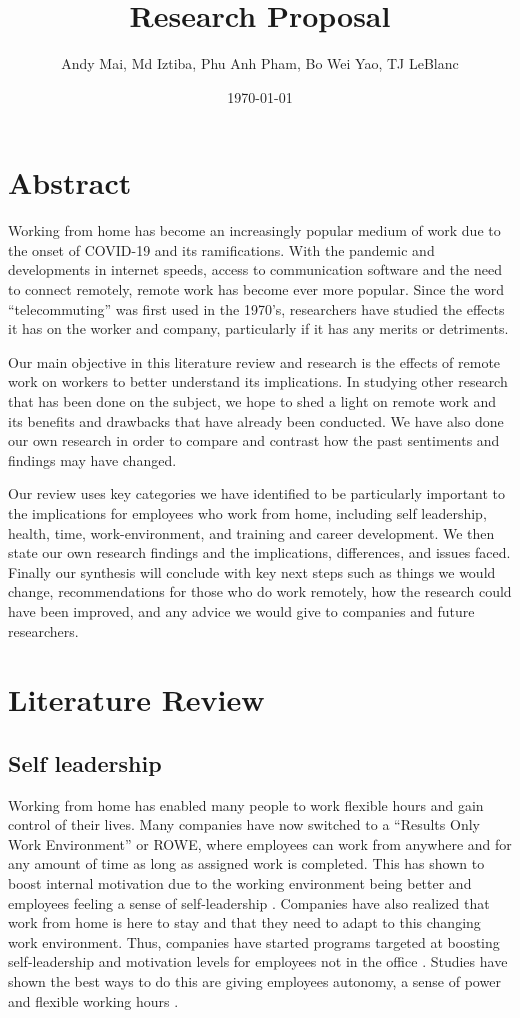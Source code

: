 \documentclass[12pt]{article}
\title{Research Proposal}
\author{Andy Mai, Md Iztiba, Phu Anh Pham, Bo Wei Yao, TJ LeBlanc}
\date{\today}
\begin{document}
\maketitle

\section*{Abstract}
Working from home has become an increasingly popular medium of work due to the onset of COVID-19 and its ramifications. With the pandemic and developments in internet speeds, access to communication software and the need to connect remotely, remote work has become ever more popular. Since the word “telecommuting” was first used in the 1970’s, researchers have studied the effects it has on the worker and company, particularly if it has any merits or detriments. 

Our main objective in this literature review and research is the effects of remote work on workers to better understand its implications. In studying other research that has been done on the subject, we hope to shed a light on remote work and its benefits and drawbacks that have already been conducted. We have also done our own research in order to compare and contrast how the past sentiments and findings may have changed. 

Our review uses key categories we have identified to be particularly important to the implications for employees who work from home, including self leadership, health, time, work-environment, and training and career development. We then state our own research findings and the implications, differences, and issues faced. Finally our synthesis will conclude with key next steps such as things we would change, recommendations for those who do work remotely, how the research could have been improved, and any advice we would give to companies and future researchers. 

\section*{Literature Review}

\subsection*{Self leadership}
Working from home has enabled many people to work flexible hours and gain control of their lives. Many companies have now switched to a “Results Only Work Environment” or ROWE, where employees can work from anywhere and for any amount of time as long as assigned work is completed. This has shown to boost internal motivation due to the working environment being better and employees feeling a sense of self-leadership \cite{Abdul}. Companies have also realized that work from home is here to stay and that they need to adapt to this changing work environment. Thus, companies have started programs targeted at boosting self-leadership and motivation levels for employees not in the office \cite{sultana2021exploring}. Studies have shown the best ways to do this are giving employees autonomy, a sense of power and flexible working hours \cite{sultana2021exploring}. 
 
\end{document}
